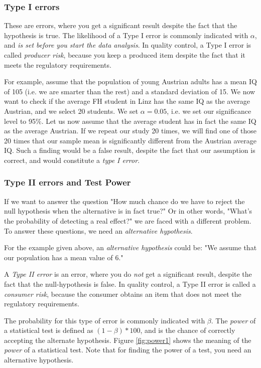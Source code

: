 \subsubsection{Type I errors}  
These are errors, where you get a significant result despite the fact that the hypothesis is true. The likelihood of a Type I error is commonly indicated with $\alpha$, and \emph{is set before you start the data analysis}. In quality control, a Type I error is called \emph{producer risk}, because you keep a produced item despite the fact that it meets the regulatory requirements.

For example, assume that the population of young Austrian adults has a mean IQ of 105 (i.e. we are smarter than the rest) and a standard deviation of 15. We now want to check if the average FH student in Linz has the same IQ as the average Austrian, and we select 20 students. We set $\alpha=0.05$, i.e. we set our significance level to 95\%.
Let us now assume that the average student has in fact the same IQ as the average Austrian. If we repeat our study 20 times, we will find one of those 20 times that our sample mean is significantly different from the Austrian average IQ. Such a finding would be a false result, despite the fact that our assumption is correct, and would constitute a \emph{type I error}.

\subsubsection{Type II errors and Test Power}
If we want to answer the question "How much chance do we have to reject the null hypothesis when the alternative is in fact true?" Or in other words, "What’s the probability of detecting a real effect?" we are faced with a different problem. To answer these questions, we need an \emph{alternative hypothesis}.

For the example given above, an \emph{alternative hypothesis} could be: "We assume that our population has a mean value of 6."

A \emph{Type II error} is an error, where you do \emph{not} get a significant result, despite the fact that the null-hypothesis is false.  In quality control, a Type II error is called a \emph{consumer risk}, because the consumer obtains an item that does not meet the regulatory requirements.

The probability for this type of error is commonly indicated with $\beta$. The \emph{power} of a statistical test is defined as $(1-\beta)*100$, and is the chance of correctly accepting the alternate hypothesis. Figure \ref{fig:power1} shows the meaning of the \emph{power} of a statistical test. Note that for finding the power of a test, you need an alternative hypothesis.

